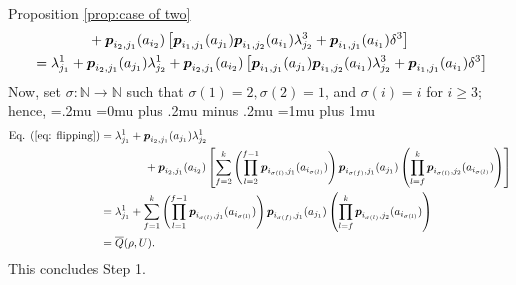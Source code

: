 \begin{proofof}{Proposition \ref{prop:case of two}}
\begin{align}
&\qquad \qquad+\boldsymbol{ p }_{i_2,j_1}(a_{i_2})\left[
\boldsymbol{ p }_{i_1,j_1}(a_{j_1})\boldsymbol{ p }_{i_1,j_2}(a_{i_1})\lambda^3_{j_2}+\boldsymbol{ p }_{i_1,j_1}(a_{i_1})\delta^3\right]\nonumber \\
&=\lambda^1_{j_1}+\boldsymbol{ p }_{i_2,j_1}(a_{j_1})\lambda^1_{j_2}+\boldsymbol{ p }_{i_2,j_1}(a_{i_2})\left[
\boldsymbol{ p }_{i_1,j_1}(a_{j_1})\boldsymbol{ p }_{i_1,j_2}(a_{i_1})\lambda^3_{j_2}+\boldsymbol{ p }_{i_1,j_1}(a_{i_1})\delta^3\right]
\end{align}
Now, set $\sigma:\mathbb N \rightarrow \mathbb N$ such that $\sigma(1)=2, \sigma(2)=1$, and $\sigma(i)=i$ for $i\geq 3$; hence,
{\thinmuskip=.2mu
\medmuskip=0mu plus .2mu minus .2mu
\thickmuskip=1mu plus 1mu
\begin{align*}
\textnormal{Eq. }\refeq{eq: flipping}&=\lambda^1_{j_1}+\bl p_{i_2,j_1}(a_{j_1})\lambda^1_{j_2}\\
&\qquad \qquad +\bl p_{i_2,j_1}(a_{i_2})\left[ 
\sum_{f=2}^{k} \left(\prod_{l=2}^{f-1} \bl p_{{i_{\sigma(l)}},{j_1}}(a_{i_{\sigma(l)}})\right) \bl p_{{i_{\sigma (f)}},{j_1}}(a_{j_1}) \left(\prod_{l=f}^{k} \bl p_{{i_{\sigma(l)}},{j_2}}(a_{i_{\sigma(l)}})\right)
 \right] \\
&= \lambda^1_{j_1}+ \sum_{f=1}^{k} \left(\prod_{l=1}^{f-1} \bl p_{{i_{\sigma(l)}},{j_1}}(a_{i_{\sigma(l)}})\right) \bl p_{{i_{\sigma (f)}},{j_1}}(a_{j_1}) \left(\prod_{l=f}^{k} \bl p_{{i_{\sigma(l)}},{j_2}}(a_{i_{\sigma(l)}})\right)\\
&= \overline Q(\rho,U).
\end{align*}
}
This concludes Step 1.

\end{proofof}
